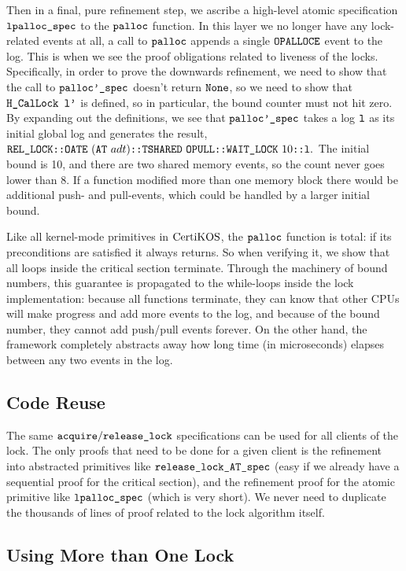 Then in a final, pure refinement step, we ascribe a high-level atomic
specification ${\mathrm{\texttt{lpalloc\_spec}}}$ to the ${\mathrm{\texttt{palloc}}}$
function. In this layer we no longer have any lock-related events at
all, a call to ${\mathrm{\texttt{palloc}}}$ appends a single
${\mathrm{\texttt{OPALLOCE}}}$ event to the log. This is when we see the
proof obligations related to liveness of the locks.
Specifically, in order to prove the downwards refinement, we need to
show that the call to ${\mathrm{\texttt{palloc'\_spec}}}$ doesn't return
${\mathrm{\texttt{None}}}$, so we need to show that ${\mathrm{\texttt{H\_CalLock}}}{\mathrm{\texttt{ l'}}}$ is
defined, so in particular, the bound counter must not hit zero.
By expanding out the definitions, we see that
${\mathrm{\texttt{palloc'\_spec}}}$ takes a log ${\mathrm{\texttt{l}}}$ as its initial global log
and generates the result,
$\rellock\codeinmath{::}\mcsoateev{(\mcsalloctable\ adt)}\codeinmath{::} \mcstshared{\mcsopullev}\codeinmath{::}\waitlock{10}\codeinmath{::l}.$
The initial bound is 10, and there are two shared memory events, so the
count never goes lower than 8. If a function modified more than one
memory block there would be additional push- and pull-events, which
could be handled by a larger initial bound.

Like all kernel-mode primitives in $\mathrm{CertiKOS}$, the ${\mathrm{\texttt{palloc}}}$ function is
total: if its preconditions are satisfied it always returns. So
when verifying it, we show that all loops inside the critical section
terminate. Through the machinery of bound numbers, this guarantee is
propagated to the while-loops inside the lock implementation:
because all functions terminate, they can know that other CPUs will
make progress and add more events to the log, and because of the
bound number, they cannot add push/pull events forever. On the other
hand, the framework completely abstracts away how long time (in microseconds) elapses
between any two events in the log.

\subsection{Code Reuse} 
The same
${\mathrm{\texttt{acquire}}}/{\mathrm{\texttt{release\_lock}}}$ specifications can be
used for all clients of the lock. The only proofs that need to be done
for a given client is the refinement into abstracted primitives like
${\mathrm{\texttt{release\_lock\_AT\_spec}}}$ (easy if we already have a sequential
proof for the critical section), and the refinement proof for the
atomic primitive like ${\mathrm{\texttt{lpalloc\_spec}}}$ (which is very
short). We never need to duplicate the thousands of lines of proof
related to the lock algorithm itself.

\subsection{Using More than One Lock}


